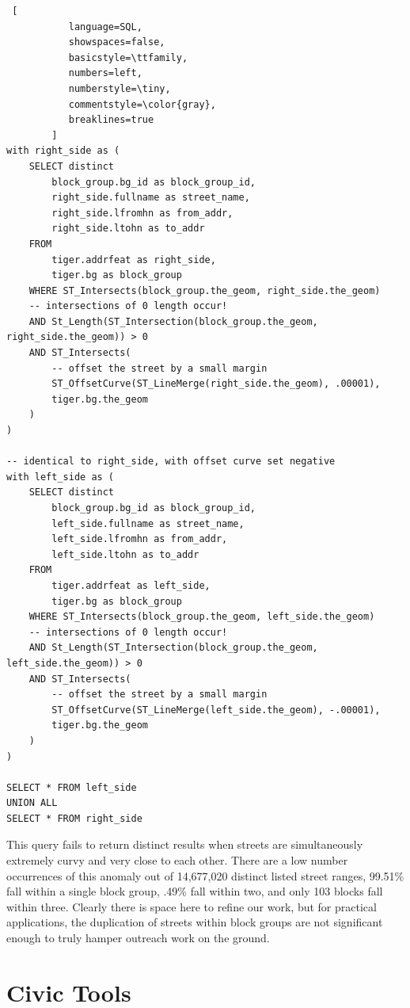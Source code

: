 \documentclass{sig-alternate}
\begin{document}
\begin{lstlisting} [
           language=SQL,
           showspaces=false,
           basicstyle=\ttfamily,
           numbers=left,
           numberstyle=\tiny,
           commentstyle=\color{gray},
           breaklines=true
        ]
with right_side as (
    SELECT distinct
        block_group.bg_id as block_group_id,
        right_side.fullname as street_name,
        right_side.lfromhn as from_addr,
        right_side.ltohn as to_addr
    FROM
        tiger.addrfeat as right_side,
        tiger.bg as block_group
    WHERE ST_Intersects(block_group.the_geom, right_side.the_geom)
    -- intersections of 0 length occur!
    AND St_Length(ST_Intersection(block_group.the_geom, right_side.the_geom)) > 0
    AND ST_Intersects(
        -- offset the street by a small margin
        ST_OffsetCurve(ST_LineMerge(right_side.the_geom), .00001),
        tiger.bg.the_geom
    )
)

-- identical to right_side, with offset curve set negative
with left_side as (
    SELECT distinct
        block_group.bg_id as block_group_id,
        left_side.fullname as street_name,
        left_side.lfromhn as from_addr,
        left_side.ltohn as to_addr
    FROM
        tiger.addrfeat as left_side,
        tiger.bg as block_group
    WHERE ST_Intersects(block_group.the_geom, left_side.the_geom)
    -- intersections of 0 length occur!
    AND St_Length(ST_Intersection(block_group.the_geom, left_side.the_geom)) > 0
    AND ST_Intersects(
        -- offset the street by a small margin
        ST_OffsetCurve(ST_LineMerge(left_side.the_geom), -.00001),
        tiger.bg.the_geom
    )
)

SELECT * FROM left_side
UNION ALL
SELECT * FROM right_side
\end{lstlisting}

This query fails to return distinct results when streets are simultaneously extremely curvy and very close to each other. There are a low number occurrences of this anomaly out of 14,677,020 distinct listed street ranges, 99.51\% fall within a single block group, .49\% fall within two, and only 103 blocks fall within three. Clearly there is space here to refine our work, but for practical applications, the duplication of streets within block groups are not significant enough to truly hamper outreach work on the ground.

\section{Civic Tools}
\end{document}

